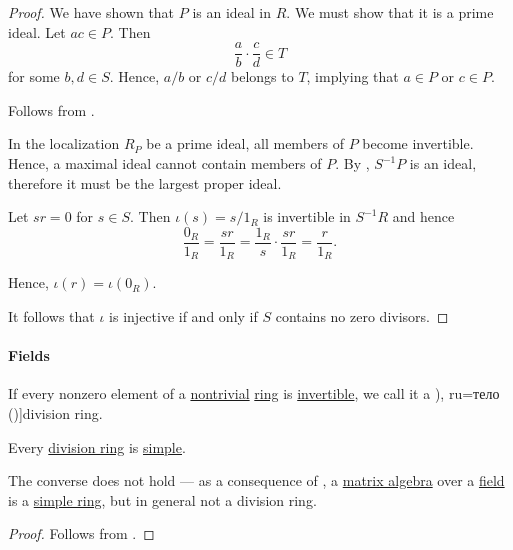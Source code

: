 \begin{proof}
  We have shown that \( P \) is an ideal in \( R \). We must show that it is a prime ideal. Let \( ac \in P \). Then
  \begin{equation*}
    \frac a b \cdot \frac c d \in T
  \end{equation*}
  for some \( b, d \in S \). Hence, \( a / b \) or \( c / d \) belongs to \( T \), implying that \( a \in P \) or \( c \in P \).

   Follows from .

   In the localization \( R_P \) be a prime ideal, all members of \( P \) become invertible. Hence, a maximal ideal cannot contain members of \( P \). By , \( S^{-1} P \) is an ideal, therefore it must be the largest proper ideal.

   Let \( sr = 0 \) for \( s \in S \). Then \( \iota(s) = s / 1_R \) is invertible in \( S^{-1} R \) and hence
  \begin{equation*}
    \frac {0_R} {1_R}
    =
    \frac {sr} {1_R}
    =
    \frac {1_R} s \cdot \frac {sr} {1_R}
    =
    \frac r {1_R}.
  \end{equation*}

  Hence, \( \iota(r) = \iota(0_R) \).

  It follows that \( \iota \) is injective if and only if \( S \) contains no zero divisors.
\end{proof}

\paragraph{Fields}

\begin{definition}\label{def:division_ring}
  If every nonzero element of a \hyperref[def:ring/trivial]{nontrivial} \hyperref[def:ring]{ring} is \hyperref[def:divisibility/invertible]{invertible}, we call it a \term[bg=тяло (\cite[def. XI.1]{ГеновМиховскиМоллов1991}), ru=тело (\cite[def. XI.6.6]{Винберг2014})]{division ring}.
\end{definition}

\begin{proposition}\label{thm:division_ring_is_simple}
  Every \hyperref[def:division_ring]{division ring} is \hyperref[def:simple_object]{simple}.
\end{proposition}
\begin{comments}
  \item The converse does not hold --- as a consequence of , a \hyperref[thm:matrix_algebra]{matrix algebra} over a \hyperref[def:field]{field} is a \hyperref[def:simple_object]{simple ring}, but in general not a division ring.
\end{comments}
\begin{proof}
  Follows from .
\end{proof}

